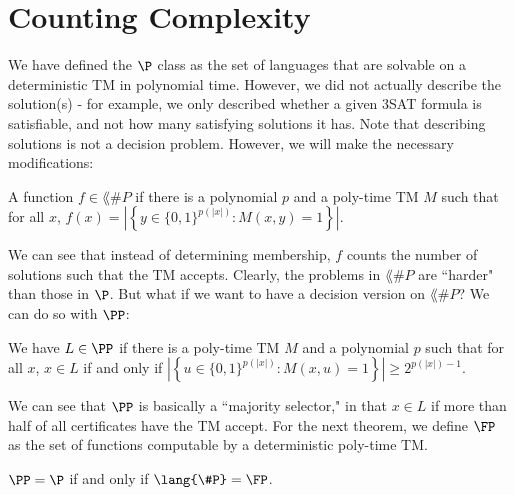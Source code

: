 \section{Counting Complexity}

We have defined the $\P$ class as the set of languages that are solvable on a deterministic TM in polynomial time. However, we did not actually describe the solution(s) - for example, we only described whether a given 3SAT formula is satisfiable, and not how many satisfying solutions it has. Note that describing solutions is not a decision problem. However, we will make the necessary modifications:

\newcommand{\SharpP}{\lang{\#P}}
\begin{definition}
A function $f \in \SharpP$ if there is a polynomial $p$ and a poly-time TM $M$ such that for all $x$, $f(x) = |\left \{y \in \{0, 1\}^{p(|x|)} \colon M(x, y) = 1\right \}|$.
\end{definition}

We can see that instead of determining membership, $f$ counts the number of solutions such that the TM accepts. Clearly, the problems in $\SharpP$ are ``harder" than those in $\P$. But what if we want to have a decision version on $\SharpP$? We can do so with $\PP$:

\begin{definition}
We have $L \in \PP$ if there is a poly-time TM $M$ and a polynomial $p$ such that for all $x$, $x \in L$ if and only if $|\left\{u \in \{0, 1\}^{p(|x|)} \colon M(x, u) = 1\right\} | \ge 2^{p(|x|)-1}$.
\end{definition}
We can see that $\PP$ is basically a ``majority selector," in that $x \in L$ if more than half of all certificates have the TM accept. For the next theorem, we define $\FP$ as the set of functions computable by a deterministic poly-time TM.

\begin{theorem}
$\PP = \P$ if and only if $\SharpP = \FP$. 
\end{theorem}


